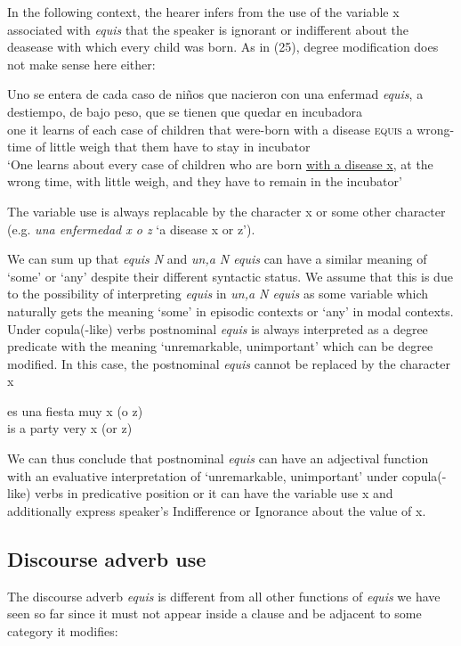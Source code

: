 \documentclass[output=paper
,modfonts
,nonflat]{langsci/langscibook}
\begin{document}
In the following context, the hearer infers from the use of the variable x associated with \textit{equis} that the speaker is ignorant or indifferent about the deasease with which every child was born. As in (25), degree modification does not make sense here either:

\ea
\gll  Uno se entera de cada caso de niños que nacieron con una enfermad \textit{equis}, a destiempo, de bajo peso, que se tienen que quedar en incubadora\\
one it learns of each case of children that were-born with a disease \textsc{equis} a wrong-time of little weigh that them have to stay in incubator\\
\glt ‘One learns about every case of children who are born \underline{with a disease x}, at the wrong time, with little weigh, and they have to remain in the incubator’
\z

The variable use is always replacable by the character x or some other character (e.g. \textit{una enfermedad x o z} ‘a disease x or z’).

We can sum up that \textit{equis N} and \textit{un,a N equis} can have a similar meaning of ‘some’ or ‘any’ despite their different syntactic status. We assume that this is due to the possibility of interpreting \textit{equis} in \textit{un,a N equis} as some variable which naturally gets the meaning ‘some’ in episodic contexts or ‘any’ in modal contexts. Under copula(-like) verbs postnominal \textit{equis} is always interpreted as a degree predicate with the meaning ‘unremarkable, unimportant’ which can be degree modified. In this case, the postnominal \textit{equis} cannot be replaced by the character x

\ea
\gll {*} es una fiesta muy x (o z)\\
{} is a party very x (or z)\\
\z

We can thus conclude that postnominal \textit{equis} can have an adjectival function with an evaluative interpretation of ‘unremarkable, unimportant’ under copula(-like) verbs in predicative position or it can have the variable use x and additionally express speaker’s Indifference or Ignorance about the value of x.

\subsection{Discourse adverb use}\label{sec:kellert:2.4}
The discourse adverb \textit{equis} is different from all other functions of \textit{equis} we have seen so far since it must not appear inside a clause and be adjacent to some category it modifies:
\end{document}
